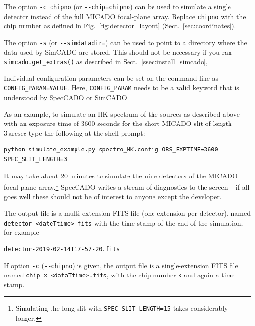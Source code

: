 \documentclass[a4paper,twoside,11pt]{article}
\begin{document}
The option \lstinline{-c chipno} (or \lstinline{--chip=chipno}) can be
used to simulate a single detector instead of the full MICADO
focal-plane array. Replace \lstinline{chipno} with the chip number as
defined in Fig.~\ref{fig:detector_layout}
(Sect.~\ref{sec:coordinates}).

The option \lstinline{-s} (or \lstinline{--simdatadir=}) can be used
to point to a directory where the data used by SimCADO are
stored. This should not be necessary if you ran
\lstinline{simcado.get_extras()} as described in
Sect.~\ref{ssec:install_simcado},

Individual configuration parameters can be set on the command line as
\lstinline{CONFIG_PARAM=VALUE}. Here, \lstinline{CONFIG_PARAM} needs
to be a valid keyword that is understood by SpecCADO or SimCADO.


As an example, to simulate an HK spectrum of the sources as described
above with an exposure time of 3600 seconds for the short MICADO slit
of length $3\,\mathrm{arcsec}$ type the following at the shell
prompt:
\begin{lstlisting}[style=csh]
python simulate_example.py spectro_HK.config OBS_EXPTIME=3600 SPEC_SLIT_LENGTH=3
\end{lstlisting}
It may take about 20~minutes to simulate the nine detectors of the
MICADO focal-plane array.\footnote{Simulating the long slit with
  \lstinline{SPEC_SLIT_LENGTH=15} takes considerably longer.} SpecCADO
writes a stream of diagnostics to the screen -- if all goes well these
should not be of interest to anyone except the developer.

The output file is a multi-extension FITS file (one extension per
detector), named \lstinline{detector-<dateTtime>.fits} with the time
stamp of the end of the simulation, for example
\begin{lstlisting}[style=csh]
detector-2019-02-14T17-57-20.fits
\end{lstlisting}
If option \lstinline{-c} (\lstinline{--chipno}) is given, the output
file is a single-extension FITS file named
\lstinline{chip-x-<dataTtime>.fits}, with the chip number
\lstinline{x} and again a time stamp.
\end{document}
